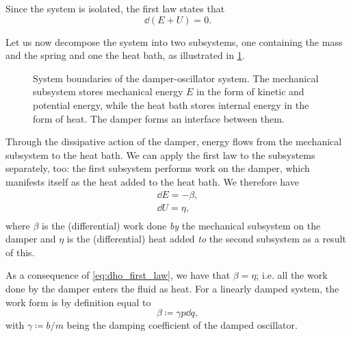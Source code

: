 Since the system is isolated, the first law states that 
\begin{equation}
    \dd{(E + U)} = 0. 
    \label{eq:dho_first_law}
\end{equation}

Let us now decompose the system into two subsystems, one containing the mass and the spring and one the heat bath, as illustrated in \cref{fig:oscillator_thermo}. 
\begin{figure}[ht!]
    \centering
    
    \caption{System boundaries of the damper-oscillator system. The mechanical subsystem stores mechanical energy \(E\) in the form of kinetic and potential energy, while the heat bath stores internal energy in the form of heat. The damper forms an interface between them.}
    \label{fig:oscillator_thermo}
\end{figure}

Through the dissipative action of the damper, energy flows from the mechanical subsystem to the heat bath. We can apply the first law to the subsystems separately, too: the first subsystem performs work on the damper, which manifests itself as the heat added to the heat bath. We therefore have
\begin{equation}
    \begin{split}
        \dd{E}  = -\beta, \\[0.2cm]
        \dd{U} = \eta, \\
    \end{split}
    \label{eq:dho_energy_balance}
\end{equation}
where \(\beta\) is the (differential) work done \emph{by} the mechanical subsystem on the damper and \(\eta\) is the (differential) heat added \emph{to} the second subsystem as a result of this. 

As a consequence of \cref{eq:dho_first_law}, we have that \( \beta = \eta \); i.e. all the work done by the damper enters the fluid as heat. For a linearly damped system, the work form is by definition equal to 
\begin{equation}
    \beta \coloneq \gamma p \dd{q},
    \label{eq:dho_work_form}
\end{equation}
with \(\gamma \coloneq b/m\) being the damping coefficient of the damped oscillator. 

